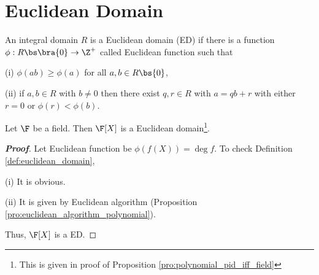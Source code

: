 \section{Euclidean Domain}%


\begin{definition}\label{def:euclidean_domain}
An integral domain $R$ is a Euclidean domain (ED) if there is a function $\phi: R \bs\bra{0} \to \Z^+$ called Euclidean function such that
\ben
\item [(i)] $\phi(ab) \geq \phi(a)$ for all $a, b \in R \bs \{0\}$,
\item [(ii)] if $a, b \in R$ with $b \neq 0$ then there exist $q, r \in R$ with $a = qb + r$ with either $r = 0$ or $\phi(r) < \phi(b)$.
\een
\end{definition}

\begin{proposition}
Let $\F$ be a field. Then $\F[X]$ is a Euclidean domain\footnote{This is given in proof of Proposition \ref{pro:polynomial_pid_iff_field}}. %
\end{proposition}

\begin{proof}[\bf Proof]
Let Euclidean function be $\phi(f(X)) = \deg f$. To check Definition \ref{def:euclidean_domain},
\ben
\item [(i)] It is obvious.
\item [(ii)] It is given by Euclidean algorithm (Proposition \ref{pro:euclidean_algorithm_polynomial}).
\een

Thus, $\F[X]$ is a ED.
\end{proof}


